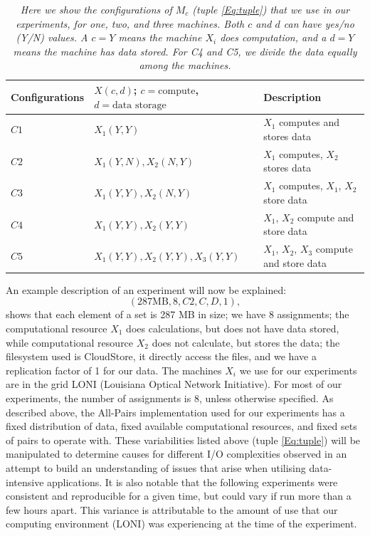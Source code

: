 \documentclass{rspublic}
\begin{document}
\begin{table}
\begin{center}
    \begin{tabular}{ | l | l | l |}
    \hline
    Configurations & $X(c,d)$; $c= \mbox{compute}$, $d=\mbox{data storage}$ & Description  \\ \hline
    $C1$ & $X_1(Y,Y)$  & $X_1$ computes and stores data\\ \hline    
    $C2$ & $X_1(Y,N), X_2(N,Y)$  & $X_1$ computes, $X_2$ stores data \\ \hline
    $C3$ & $X_1(Y,Y), X_2(N,Y)$  & $X_1$ computes, $X_1$, $X_2$ store data \\ \hline
    $C4$ & $X_1(Y,Y), X_2(Y,Y)$  & $X_1$, $X_2$ compute and store data \\ \hline
    $C5$ & $X_1(Y,Y), X_2(Y,Y), X_3(Y,Y)$  & $X_1$, $X_2$, $X_3$ compute and store data \\ 
    \hline
    \end{tabular}
\end{center}
    \caption{\textit{Here we show the configurations of $M_c$ (tuple
\ref{Eq:tuple}) that we use in our experiments, for one, two, and three
machines. Both $c$ and $d$ can have yes/no (Y/N) values. A $c = Y$ means
the machine $X_i$ does computation, and a $d = Y$ means the machine has
data stored. For C4 and C5, we divide the data equally among the
machines.}}
    \label{Tab:Configs}
\end{table}

An example description of an experiment will now be explained:
 \begin{equation}
(287 \mbox{MB}, 8, C2, C, D, 1),
\end{equation}
shows that each element of a set is 287 MB in size; we have 8
assignments; the computational resource $X_1$ does calculations, but
does not have data stored, while computational resource $X_2$ does not
calculate, but stores the data; the filesystem used is CloudStore, it
directly access the files, and we have a replication factor of 1 for our
data. The machines $X_i$ we use for our experiments are in the grid LONI
(Louisiana Optical Network Initiative). For most of our experiments, the
number of assignments is 8, unless otherwise specified.  As described
above, the All-Pairs implementation used for our experiments has a fixed
distribution of data, fixed available computational resources, and fixed
sets of pairs to operate with.  These variabilities listed above (tuple
\ref{Eq:tuple}) will be manipulated to determine causes for different
I/O complexities observed in an attempt to build an understanding of
issues that arise when utilising data-intensive applications. It is also
notable that the following experiments were consistent and reproducible
for a given time, but could vary if run more than a few hours apart.
This variance is attributable to the amount of use that our computing
environment (LONI) was experiencing at the time of the experiment.
\end{document}
